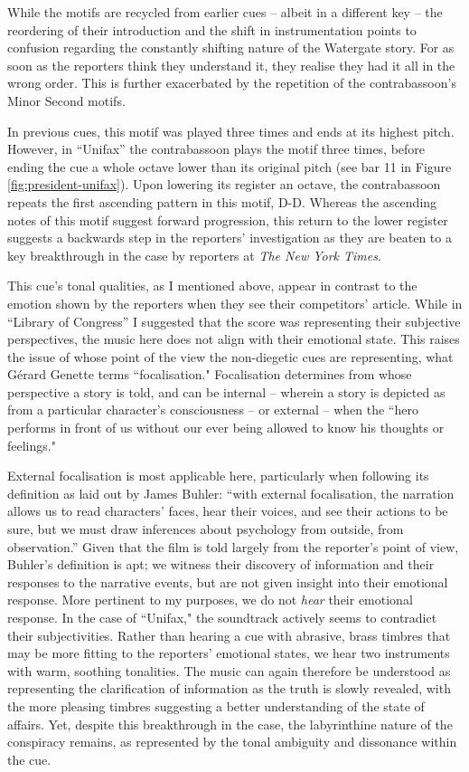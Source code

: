 While the motifs are recycled from earlier cues – albeit in a different key – the reordering of their introduction and the shift in instrumentation points to confusion regarding the constantly shifting nature of the Watergate story.
For as soon as the reporters think they understand it, they realise they had it all in the wrong order.
This is further exacerbated by the repetition of the contrabassoon’s Minor Second motifs.

In previous cues, this motif was played three times and ends at its highest pitch.
However, in ``Unifax” the contrabassoon plays the motif three times, before ending the cue a whole octave lower than its original pitch (see bar 11 in Figure \ref{fig:president-unifax}).
Upon lowering its register an octave, the contrabassoon repeats the first ascending pattern in this motif, D-D\sharp.
Whereas the ascending notes of this motif suggest forward progression, this return to the lower register suggests a backwards step in the reporters’ investigation as they are beaten to a key breakthrough in the case by reporters at \textit{The New York Times}.

This cue’s tonal qualities, as I mentioned above, appear in contrast to the emotion shown by the reporters when they see their competitors' article.
While in “Library of Congress” I suggested that the score was representing their subjective perspectives, the music here does not align with their emotional state.
This raises the issue of whose point of the view the non-diegetic cues are representing, what Gérard Genette terms ``focalisation."
Focalisation determines from whose perspective a story is told, and can be internal – wherein a story is depicted as from a particular character’s consciousness – or external  – when the ``hero performs in front of us without our ever being allowed to know his thoughts or feelings."\autocites[][190]{genette_narrative_1980}

External focalisation is most applicable here, particularly when following its definition as laid out by James Buhler: 
``with external focalisation, the narration allows us to read characters’ faces, hear their voices, and see their actions to be sure, but we must draw inferences about psychology from outside, from observation.”\autocites[][177]{buhler_theories_2018}
Given that the film is told largely from the reporter’s point of view, Buhler’s definition is apt; we witness their discovery of information and their responses to the narrative events, but are not given insight into their emotional response.
More pertinent to my purposes, we do not \textit{hear} their emotional response.
In the case of ``Unifax," the soundtrack actively seems to contradict their subjectivities.
Rather than hearing a cue with abrasive, brass timbres that may be more fitting to the reporters’ emotional states, we hear two instruments with warm, soothing tonalities.
The music can again therefore be understood as representing the clarification of information as the truth is slowly revealed, with the more pleasing timbres suggesting a better understanding of the state of affairs.
Yet, despite this breakthrough in the case, the labyrinthine nature of the conspiracy remains, as represented by the tonal ambiguity and dissonance within the cue.


